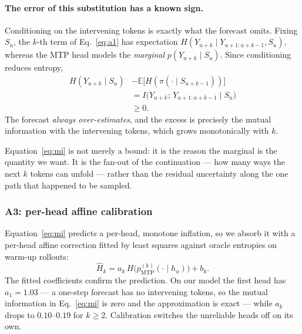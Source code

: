 \documentclass[11pt]{article}
\newcommand{\E}{\mathbb{E}}
\begin{document}
\paragraph{The error of this substitution has a known sign.}
Conditioning on the intervening tokens is exactly what the forecast omits. Fixing
$S_u$, the $k$-th term of Eq.~\eqref{eq:a1} has expectation
$H(Y_{u+k} \mid Y_{u+1:u+k-1}, S_u)$, whereas the MTP head models the
\emph{marginal} $p(Y_{u+k} \mid S_u)$. Since conditioning reduces entropy,
%
\begin{equation}
\begin{split}
H(Y_{u+k} \mid S_u) &- \E\bigl[H(\pi(\cdot \mid S_{u+k-1}))\bigr]\\
&= I\bigl(Y_{u+k};\, Y_{u+1:u+k-1} \mid S_u\bigr)\\
&\ge 0 .
\end{split}
\label{eq:mi}
\end{equation}
%
The forecast \emph{always over-estimates}, and the excess is precisely the mutual
information with the intervening tokens, which grows monotonically with $k$.

Equation~\eqref{eq:mi} is not merely a bound: it is the reason the marginal is the
quantity we want. It is the fan-out of the continuation --- how many ways the next
$k$ tokens can unfold --- rather than the residual uncertainty along the one path
that happened to be sampled.

\subsubsection{A3: per-head affine calibration}

Equation~\eqref{eq:mi} predicts a per-head, monotone inflation, so we absorb it with
a per-head affine correction fitted by least squares against oracle entropies on
warm-up rollouts:
%
\begin{equation}
\hat{H}_k = a_k\, H\bigl(p^{(k)}_{\mathrm{MTP}}(\cdot \mid h_u)\bigr) + b_k .
\label{eq:a3}
\end{equation}
%
The fitted coefficients confirm the prediction. On our model the first head has
$a_1 = 1.03$ --- a one-step forecast has no intervening tokens, so the mutual
information in Eq.~\eqref{eq:mi} is zero and the approximation is exact --- while
$a_k$ drops to $0.10$--$0.19$ for $k \ge 2$. Calibration switches the unreliable
heads off on its own.
\end{document}
